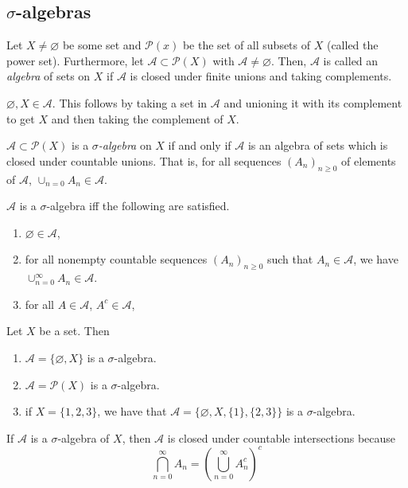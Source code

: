 \documentclass[11pt,leqno,oneside]{amsbook}
\numberwithin{thm}{section}
\renewcommand{\P}{\mathcal{P}}
\renewcommand{\A}{\mathcal{A}}
\begin{document}
\subsection{$\sigma$-algebras}
\begin{defn}
Let $X \neq \varnothing$ be some set and $\P(x)$ be the set of all
subsets of $X$ (called the power set). Furthermore, let $\A \subset
\P(X)$ with $\A \neq \varnothing$. Then, $\A$ is called an \emph{algebra} of
sets on $X$ if $\A$ is closed under finite unions and taking
complements.
\end{defn}
\begin{lem}
  $\varnothing, X \in \A$. This follows by taking a set in $\A$ and
  unioning it with its complement to get $X$ and then taking the
  complement of $X$.
\end{lem}
\begin{defn}
  $\A \subset \P(X)$ is a \emph{$\sigma$-algebra} on $X$ if and only if
  $\A$ is an algebra of sets which is closed under countable
  unions. That is, for all sequences $(A_n)_{n \geq 0}$ of elements of $\A$,
  $\cup_{n=0} A_n \in \A$.
\end{defn}
\begin{thm}
  $\A$ is a $\sigma$-algebra iff the following are satisfied.
  \begin{enumerate}
    \item $\varnothing \in \A$,
    \item for all nonempty countable sequences $(A_n)_{n \geq 0}$ such that $A_n \in \A$, we have
      $\cup_{n=0}^\infty A_n \in \A$.
    \item for all $A \in \A$, $A^c \in \A$,
  \end{enumerate}
\end{thm}
\begin{example}
  Let $X$ be a set. Then
  \begin{enumerate}
  \item $\A = \{\varnothing,X\}$ is a $\sigma$-algebra.
  \item $\A = \P(X)$ is a $\sigma$-algebra.
  \item if $X = \{1,2,3\}$, we have that $\A =
    \{\varnothing,X,\{1\},\{2,3\}\}$ is a $\sigma$-algebra.
  \end{enumerate}
\end{example}
\begin{prop}
  If $\A$ is a $\sigma$-algebra of $X$, then $\A$ is closed under
  countable intersections because \[
    \bigcap_{n=0}^\infty A_n = \left( \bigcup_{n=0}^\infty A_n^c \right)^c
  \]
\end{prop}
\end{document}
